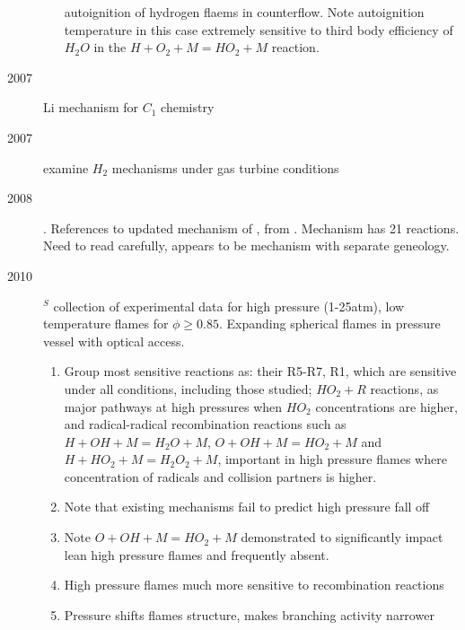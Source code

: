 \documentclass[preprint,3p,times,twocolumn]{elsarticle}
\begin{document}
\begin{description}
\begin{enumerate}
                          autoignition of hydrogen flaems in
                          counterflow. Note autoignition temperature
                          in this case extremely sensitive to third
                          body efficiency of $H_2O$ in the $H + O_2 +
                          M = HO_2 +M$ reaction.
                  \end{enumerate}
                  \item[2007] \citet{LiZKCDS07} Li mechanism for $C_1$ chemistry
            \item[2007] \citet{StrohleM07} examine $H_2$ mechanisms
              under gas turbine conditions
              \item[2008] \citet{Konnov08}. References to updated
                mechanism of \citet{Konnov04}, from \citet{Konnov00}. Mechanism has 21
                reactions.  Need to read carefully, appears to be
                mechanism with separate geneology. 
            \item[2010]$^S$ \citet{BurkeCDJ10} collection of experimental data
                for high pressure (1-25atm), low temperature flames for $\phi
                \ge 0.85$. Expanding spherical flames in pressure vessel with
                optical access. 
                \begin{enumerate}
                    \item Group most sensitive reactions as: their R5-R7, R1,
                        which are sensitive under all conditions, including
                        those studied; $HO_2 + R$ reactions, as major pathways
                        at high pressures when $HO_2$ concentrations are
                        higher, and radical-radical recombination reactions
                        such as $H + OH + M = H_2O + M$,  $O + OH + M = HO_2 +
                        M$ and $H + HO_2 + M = H_2O_2 + M$, important in high
                        pressure flames where concentration of radicals and
                        collision partners is higher. 
                    \item Note that existing mechanisms fail to predict high pressure fall off
                    \item Note $O + OH + M = HO_2 + M$ demonstrated to
                        significantly impact lean high pressure flames and
                        frequently absent. 
                    \item High pressure flames much more sensitive to recombination reactions
                    \item Pressure shifts flames structure, makes branching activity narrower

\end{enumerate}
\end{description}
\end{document}
